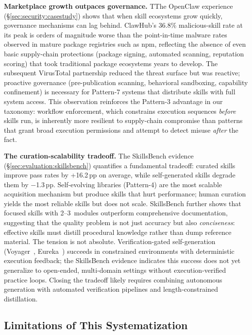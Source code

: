\documentclass[conference, compsoc]{IEEEtran}
\theoremstyle{plain}
\newcommand{\para}[1]{\smallskip\noindent\textbf{#1.}}
\begin{document}
{\para{Marketplace growth outpaces governance} TThe OpenClaw experience (\S\ref{sec:security:casestudy}) shows that when skill ecosystems grow quickly, governance mechanisms can lag behind. ClawHub's 36.8\% malicious-skill rate at its peak is orders of magnitude worse than the point-in-time malware rates observed in mature package registries such as npm, reflecting the absence of even basic supply-chain protections (package signing, automated scanning, reputation scoring) that took traditional package ecosystems years to develop. The subsequent VirusTotal partnership reduced the threat surface but was reactive; proactive governance (pre-publication scanning, behavioral sandboxing, capability confinement) is necessary for Pattern-7 systems that distribute skills with full system access. This observation reinforces the Pattern-3 advantage in our taxonomy: workflow enforcement, which constrains execution sequences \emph{before} skills run, is inherently more resilient to supply-chain compromise than patterns that grant broad execution permissions and attempt to detect misuse \emph{after} the fact.

\para{The curation-scalability tradeoff} The SkillsBench evidence (\S\ref{sec:evaluation:skillsbench}) quantifies a fundamental tradeoff: curated skills improve pass rates by +16.2\,pp on average, while self-generated skills degrade them by $-$1.3\,pp. Self-evolving libraries (Pattern-4) are the most scalable acquisition mechanism but produce skills that hurt performance; human curation yields the most reliable skills but does not scale. SkillsBench further shows that focused skills with 2--3~modules outperform comprehensive documentation, suggesting that the quality problem is not just accuracy but also \emph{conciseness}: effective skills must distill procedural knowledge rather than dump reference material. The tension is not absolute. Verification-gated self-generation (Voyager~\cite{wang2023voyager}, Eureka~\cite{ma2024eureka}) succeeds in constrained environments with deterministic execution feedback; the SkillsBench evidence indicates this success does not yet generalize to open-ended, multi-domain settings without execution-verified practice loops. Closing the tradeoff likely requires combining autonomous generation with automated verification pipelines and length-constrained distillation.

\subsection{Limitations of This Systematization}
\label{sec:discussion:limitations}

}
\end{document}
